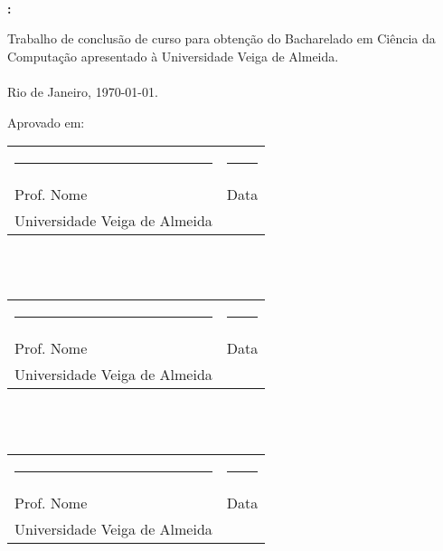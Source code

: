 \begin{center}

    \thispagestyle{pretext}
    
    \ \\ 
    \printAuthors

    \vfill

    \textbf{\uppercase\expandafter{\TitleName}:} \\
    \textbf{\uppercase\expandafter{\SubtitleName}}

    \vfill


    \begin{adjustwidth}{7.5cm}{}
        \noindent Trabalho de conclusão de curso para obtenção do Bacharelado em Ciência da Computação apresentado à Universidade Veiga de Almeida. \\ \ \\
        
        Rio de Janeiro, \today.
    \end{adjustwidth}

\end{center}

\vfill

Aprovado em:\\[0.5cm]

\begin{tabularx}{\textwidth}{Xc}
    \rule{0.6\textwidth}{0.4pt} & \rule{0.3\textwidth}{0.4pt} \\

    Prof. Nome & Data \\ 
    Universidade Veiga de Almeida
\end{tabularx} \\ \ \\

\begin{tabularx}{\textwidth}{Xc}
    \rule{0.6\textwidth}{0.4pt} & \rule{0.3\textwidth}{0.4pt} \\

    Prof. Nome & Data \\ 
    Universidade Veiga de Almeida
\end{tabularx} \\ \ \\

\begin{tabularx}{\textwidth}{Xc}
    \rule{0.6\textwidth}{0.4pt} & \rule{0.3\textwidth}{0.4pt} \\

    Prof. Nome & Data \\ 
    Universidade Veiga de Almeida
\end{tabularx}


\vfill


\newpage
